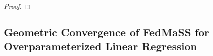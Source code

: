 \begin{proof}
\begin{comment}
		\begin{align*}
		-2\alpha_{t}\mathbb{E}_{t}\langle\overline{w}_{t}-w^{\ast},g_{t}\rangle & =-2\alpha_{t}\sum_{k=1}^{N}p_{k}\langle\overline{w}_{t}-w^{\ast},\nabla F_{k}(w_{t}^{k})\rangle\\
		& =-2\alpha_{t}\sum_{k=1}^{N}p_{k}\langle\overline{w}_{t}-w_{t}^{k},\nabla F_{k}(w_{t}^{k})\rangle-2\alpha_{t}\sum_{k=1}^{N}p_{k}\langle w_{t}^{k}-w^{\ast},\nabla F_{k}(w_{t}^{k})\rangle\\
		& =-2\alpha_{t}\sum_{k=1}^{N}p_{k}\langle\overline{w}_{t}-w_{t}^{k},H^{k}(w_{t}^{k}-w^{\ast})\rangle-2\alpha_{t}\sum_{k=1}^{N}p_{k}\langle w_{t}^{k}-w^{\ast},H^{k}(w_{t}^{k}-w^{\ast})\rangle\\
		& =-2\alpha_{t}\sum_{k=1}^{N}p_{k}\langle\overline{w}_{t}-w_{t}^{k},H^{k}(w_{t}^{k}-w^{\ast})\rangle-4\alpha_{t}\sum_{k=1}^{N}p_{k}F_{k}(w_{t}^{k})\\
		& =\alpha_{t}L\sum_{k=1}^{N}p_{k}\|\overline{w}_{t}-w_{t}^{k}\|^{2}-2\alpha_{t}\sum_{k=1}^{N}p_{k}F_{k}(\overline{w}_{t})-2\alpha_{t}\sum_{k=1}^{N}p_{k}F_{k}(w_{t}^{k})
		\end{align*}
		so that 
		\begin{align*}
		\|\overline{w}_{t+1}-w^{\ast}\|^{2} & =\|\overline{w}_{t}-w^{\ast}\|^{2}+\alpha_{t}L\sum_{k=1}^{N}p_{k}\|\overline{w}_{t}-w_{t}^{k}\|^{2}-2\alpha_{t}\sum_{k=1}^{N}p_{k}F_{k}(\overline{w}_{t})-2\alpha_{t}\sum_{k=1}^{N}p_{k}F_{k}(w_{t}^{k})+\|\sum_{k=1}^{N}p_{k}\tilde{H}_{t}^{k}(w_{t}^{k}-w^{\ast})\|^{2}
		\end{align*}
		and applying this recursively, we have 
		\begin{align*}
		\|\overline{w}_{t+1}-w^{\ast}\|^{2} & =\|\overline{w}_{t-1}-w^{\ast}\|^{2}-4\alpha_{t-1}\sum_{k=1}^{N}p_{k}F_{k}(\overline{w}_{t-1})+\alpha_{t}^{2}\|\sum_{k=1}^{N}p_{k}\tilde{H}_{t}^{k}(\overline{w}_{t-1}-w^{\ast})\|^{2}\\
		& +\alpha_{t}L\sum_{k=1}^{N}p_{k}\|\overline{w}_{t}-w_{t}^{k}\|^{2}-2\alpha_{t}\sum_{k=1}^{N}p_{k}F_{k}(\overline{w}_{t})-2\alpha_{t}\sum_{k=1}^{N}p_{k}F_{k}(w_{t}^{k})+\alpha_{t}^{2}\|\sum_{k=1}^{N}p_{k}\tilde{H}_{t}^{k}(w_{t}^{k}-w^{\ast})\|^{2}
		\end{align*}
		\end{proof}
		\end{comment}
	\end{proof}
	
	
	\subsection{Geometric Convergence of FedMaSS for Overparameterized Linear Regression}
	
